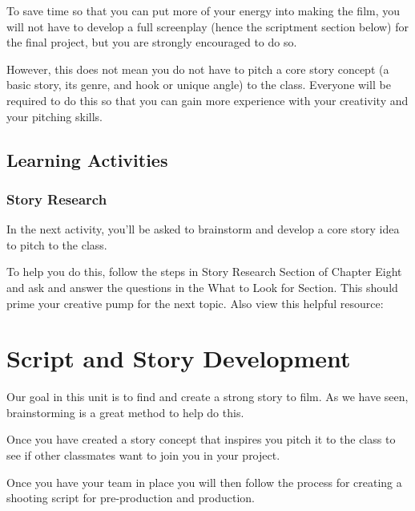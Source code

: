 \documentclass[
]{book}
\begin{document}
To save time so that you can put more of your energy into making the film, you will not have to develop a full screenplay (hence the scriptment section below) for the final project, but you are strongly encouraged to do so.

However, this does not mean you do not have to pitch a core story concept (a basic story, its genre, and hook or unique angle) to the class. Everyone will be required to do this so that you can gain more experience with your creativity and your pitching skills.

\hypertarget{learning-activities-7}{%
\subsection*{Learning Activities}\label{learning-activities-7}}

\begin{reflect}
\hypertarget{story-research}{%
\subsubsection*{Story Research}\label{story-research}}

In the next activity, you'll be asked to brainstorm and develop a core story idea to pitch to the class.

To help you do this, follow the steps in Story Research Section of Chapter Eight and ask and answer the questions in the What to Look for Section. This should prime your creative pump for the next topic. Also view this helpful resource:
\end{reflect}

\hypertarget{script-and-story-development}{%
\section{Script and Story Development}\label{script-and-story-development}}

Our goal in this unit is to find and create a strong story to film. As we have seen, brainstorming is a great method to help do this.

Once you have created a story concept that inspires you pitch it to the class to see if other classmates want to join you in your project.

Once you have your team in place you will then follow the process for creating a shooting script for pre-production and production.
\end{document}
